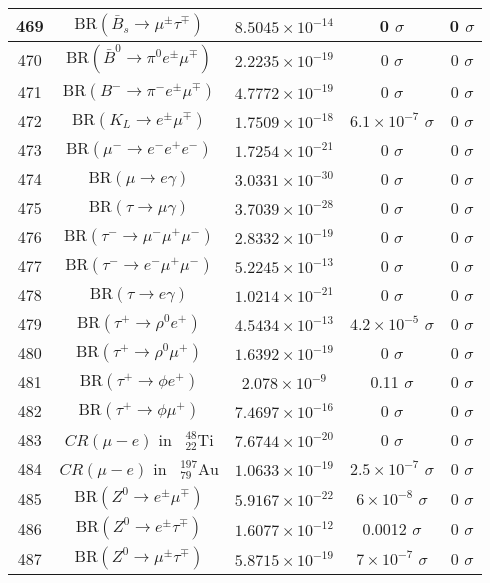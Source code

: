 \begin{longtable}{|c|c|c|c|c|}
469 &	 $\mathrm{BR}(\bar B_s\to \mu^\pm \tau^\mp)$ &	 $8.5045\times 10^{-14}$ &	 0 $ \sigma$ &	 0 $ \sigma$ \\ \hline
470 &	 $\mathrm{BR}(\bar B^0\to \pi^0 e^\pm\mu^\mp)$ &	 $2.2235\times 10^{-19}$ &	 0 $ \sigma$ &	 0 $ \sigma$ \\ \hline
471 &	 $\mathrm{BR}(B^-\to \pi^- e^\pm\mu^\mp)$ &	 $4.7772\times 10^{-19}$ &	 0 $ \sigma$ &	 0 $ \sigma$ \\ \hline
472 &	 $\mathrm{BR}(K_L\to e^\pm\mu^\mp)$ &	 $1.7509\times 10^{-18}$ &	 \cellcolor{red!0}$6.1\times 10^{-7}$ $ \sigma$ &	 0 $ \sigma$ \\ \hline
473 &	 $\mathrm{BR}(\mu^-\to e^-e^+e^-)$ &	 $1.7254\times 10^{-21}$ &	 0 $ \sigma$ &	 0 $ \sigma$ \\ \hline
474 &	 $\mathrm{BR}(\mu\to e\gamma)$ &	 $3.0331\times 10^{-30}$ &	 0 $ \sigma$ &	 0 $ \sigma$ \\ \hline
475 &	 $\mathrm{BR}(\tau\to \mu\gamma)$ &	 $3.7039\times 10^{-28}$ &	 0 $ \sigma$ &	 0 $ \sigma$ \\ \hline
476 &	 $\mathrm{BR}(\tau^-\to \mu^-\mu^+\mu^-)$ &	 $2.8332\times 10^{-19}$ &	 0 $ \sigma$ &	 0 $ \sigma$ \\ \hline
477 &	 $\mathrm{BR}(\tau^-\to e^-\mu^+\mu^-)$ &	 $5.2245\times 10^{-13}$ &	 0 $ \sigma$ &	 0 $ \sigma$ \\ \hline
478 &	 $\mathrm{BR}(\tau\to e\gamma)$ &	 $1.0214\times 10^{-21}$ &	 0 $ \sigma$ &	 0 $ \sigma$ \\ \hline
479 &	 $\mathrm{BR}(\tau^+\to \rho^0 e^+)$ &	 $4.5434\times 10^{-13}$ &	 \cellcolor{red!0}$4.2\times 10^{-5}$ $ \sigma$ &	 0 $ \sigma$ \\ \hline
480 &	 $\mathrm{BR}(\tau^+\to \rho^0\mu^+)$ &	 $1.6392\times 10^{-19}$ &	 0 $ \sigma$ &	 0 $ \sigma$ \\ \hline
481 &	 $\mathrm{BR}(\tau^+\to \phi e^+)$ &	 $2.078\times 10^{-9}$ &	 \cellcolor{red!5}0.11 $ \sigma$ &	 0 $ \sigma$ \\ \hline
482 &	 $\mathrm{BR}(\tau^+\to \phi\mu^+)$ &	 $7.4697\times 10^{-16}$ &	 0 $ \sigma$ &	 0 $ \sigma$ \\ \hline
483 &	 $CR(\mu - e)$ in $\phantom k^{48}_{22} \mathrm{Ti}$ &	 $7.6744\times 10^{-20}$ &	 0 $ \sigma$ &	 0 $ \sigma$ \\ \hline
484 &	 $CR(\mu - e)$ in $\phantom k^{197}_{79} \mathrm{Au}$ &	 $1.0633\times 10^{-19}$ &	 \cellcolor{red!0}$2.5\times 10^{-7}$ $ \sigma$ &	 0 $ \sigma$ \\ \hline
485 &	 $\mathrm{BR}(Z^0\to  e^\pm\mu^\mp)$ &	 $5.9167\times 10^{-22}$ &	 \cellcolor{red!0}$6\times 10^{-8}$ $ \sigma$ &	 0 $ \sigma$ \\ \hline
486 &	 $\mathrm{BR}(Z^0\to  e^\pm\tau^\mp)$ &	 $1.6077\times 10^{-12}$ &	 \cellcolor{red!0}0.0012 $ \sigma$ &	 0 $ \sigma$ \\ \hline
487 &	 $\mathrm{BR}(Z^0\to \mu^\pm\tau^\mp)$ &	 $5.8715\times 10^{-19}$ &	 \cellcolor{red!0}$7\times 10^{-7}$ $ \sigma$ &	 0 $ \sigma$ \\ \hline
\end{longtable}
